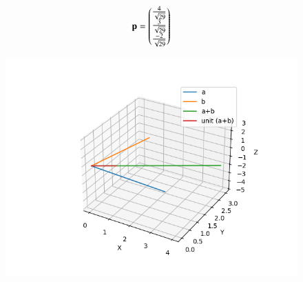 \documentclass[journal]{IEEEtran}
\begin{document}
    \begin{align}
	 \mathbf{p} = \begin{pmatrix}\frac{4}{\sqrt{29}}\\\frac{3}{\sqrt{29}}\\\frac{-2}{\sqrt{29}}\end{pmatrix}  
	\end{align}
    
\begin{figure}[H]
    \centering
    \includegraphics{figs/plot.png}
    \caption*{}
    \label{fig:plot}
\end{figure}    
\end{document}
